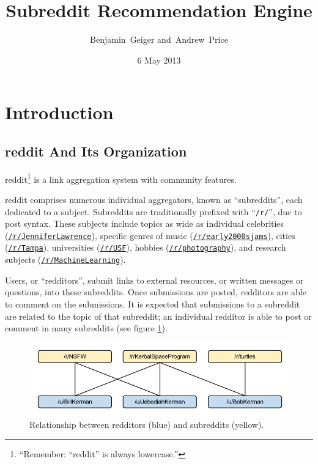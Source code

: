 \documentclass[journal, draftclsnofoot]{./styles/IEEEtran}
\begin{document}
\title{Subreddit Recommendation Engine}
\author{Benjamin~Geiger and~Andrew~Price}
\date{6 May 2013}



\maketitle

\begin{abstract}
\end{abstract}

\section{Introduction}


\subsection{reddit And Its Organization}

reddit\footnote{``Remember: ``reddit'' is always
lowercase.''\cite{reddit-thealien}} is a link aggregation system with
community features.

reddit comprises numerous individual aggregators, known as
``subreddits'', each dedicated to a subject. Subreddits are
traditionally prefixed with ``\texttt{/r/}'', due to post syntax.  These
subjects include topics as wide as individual celebrities
(\href{http://reddit.com/r/JenniferLawrence}{\texttt{/r/JenniferLawrence}}),
specific genres of music
(\href{http://reddit.com/r/early2000sjams}{\texttt{/r/early2000sjams}}),
cities (\href{http://reddit.com/r/Tampa}{\texttt{/r/Tampa}}),
universities (\href{http://reddit.com/r/USF}{\texttt{/r/USF}}), hobbies
(\href{http://reddit.com/r/photography}{\texttt{/r/photography}}), and
research subjects
(\href{http://reddit.com/r/MachineLearning}{\texttt{/r/MachineLearning}}).

Users, or ``redditors'', submit links to external resources, or written
messages or questions, into these subreddits. Once submissions are
posted, redditors are able to comment on the submissions. It is expected
that submissions to a subreddit are related to the topic of that
subreddit; an individual redditor is able to post or comment in many
subreddits (see figure \ref{fig:reddit}).

\begin{figure}[!t]
\centering
\includegraphics[width=\linewidth]{reddit.png}
\caption{Relationship between redditors (blue) and subreddits (yellow).}
\label{fig:reddit}
\end{figure}
\end{document}
